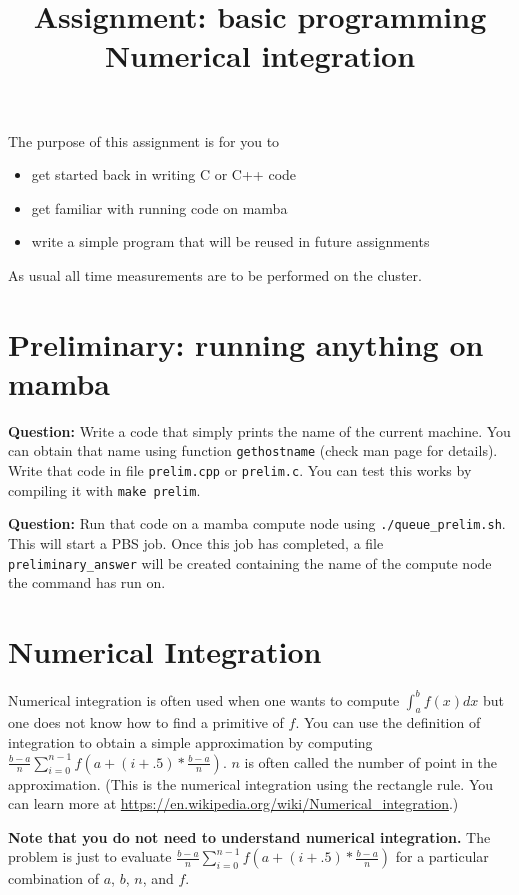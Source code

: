 \documentclass{article}
\title{\vspace{-3em}Assignment: basic programming\\Numerical integration}
\date{}
\newcommand{\question}{{\noindent \bf Question: }}
\begin{document}
\maketitle

The purpose of this assignment is for you to 
\begin{itemize}
\item get started back in writing C or C++ code
\item get familiar with running code on mamba
\item write a simple program that will be reused in future assignments
\end{itemize}

As usual all time measurements are to be performed on the cluster.

\section{Preliminary: running anything on mamba}

\question Write a code that simply prints the name of the current
machine. You can obtain that name using function \texttt{gethostname}
(check man page for details). Write that code in file
\texttt{prelim.cpp} or \texttt{prelim.c}. You can test this works by compiling it with \texttt{make prelim}.

\question Run that code on a mamba compute node using
\texttt{./queue\_prelim.sh}. This will start a PBS job. Once this job
has completed, a file \texttt{preliminary\_answer} will be created
containing the name of the compute node the command has run on.

\section{Numerical Integration}

Numerical integration is often used when one wants to compute
$\int_{a}^{b} f(x) dx$ but one does not know how to find a primitive
of $f$. You can use the definition of integration to obtain a simple
approximation by computing $\frac{b-a}{n} \sum_{i=0}^{n-1}
f\left(a+(i+.5)*\frac{b-a}{n}\right)$. $n$ is often called
the number of point in the approximation. (This is the numerical
integration using the rectangle rule. You can learn more at
\url{https://en.wikipedia.org/wiki/Numerical_integration}.)

{\bf Note that you do not need to understand numerical
integration.} The problem is just to evaluate $\frac{b-a}{n} \sum_{i=0}^{n-1}
f \left( a+(i+.5)*\frac{b-a}{n} \right)$ for a particular
combination of $a$, $b$, $n$, and $f$.
\end{document}
